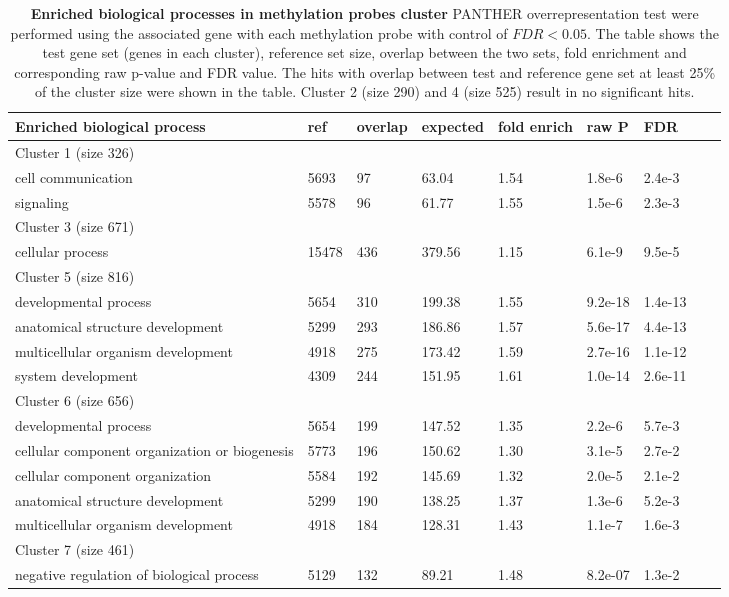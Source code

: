 \documentclass{article}
\begin{document}
\begin{table*}[ht!]
\centering
\begin{small}
\begin{tabular}{lllllllll}
  \toprule
Enriched biological process & ref & overlap & expected & fold enrich & raw P & FDR \\ 
  \midrule
  Cluster 1 (size 326) \\
  \midrule
  cell communication & 5693 &  97 & 63.04 & 1.54 & 1.8e-6 & 2.4e-3 \\ 
  signaling & 5578 &  96 & 61.77 & 1.55 & 1.5e-6 & 2.3e-3 \\ 
   \midrule
   Cluster 3 (size 671) \\
   \midrule
     cellular process & 15478 & 436 & 379.56 & 1.15 & 6.1e-9 & 9.5e-5 \\ 
\midrule
  Cluster 5 (size 816)\\
  \midrule
  developmental process  & 5654 & 310 & 199.38 & 1.55 & 9.2e-18 & 1.4e-13 \\ 
  anatomical structure development & 5299 & 293 & 186.86 & 1.57 & 5.6e-17 & 4.4e-13 \\ 
  multicellular organism development & 4918 & 275 & 173.42 & 1.59 & 2.7e-16 & 1.1e-12 \\ 
  system development & 4309 & 244 & 151.95 & 1.61 & 1.0e-14 & 2.6e-11 \\ 
     \midrule
   Cluster 6 (size 656)\\
  \midrule
  developmental process & 5654 & 199 & 147.52 & 1.35 & 2.2e-6 & 5.7e-3 \\ 
  cellular component organization or biogenesis & 5773 & 196 & 150.62 & 1.30 & 3.1e-5 & 2.7e-2 \\ 
  cellular component organization & 5584 & 192 & 145.69 & 1.32 & 2.0e-5 & 2.1e-2 \\ 
  anatomical structure development & 5299 & 190 & 138.25 & 1.37 & 1.3e-6 & 5.2e-3 \\ 
  multicellular organism development & 4918 & 184 & 128.31 & 1.43 & 1.1e-7 & 1.6e-3 \\ 
     \midrule
     Cluster 7 (size 461) \\
     \midrule
     negative regulation of biological process & 5129 & 132 & 89.21 & 1.48 & 8.2e-07 & 1.3e-2 \\ 
	\bottomrule
\end{tabular}
\end{small}
\caption{\textbf{Enriched biological processes in \citet{figueroa2010dna} methylation probes cluster} PANTHER overrepresentation test were performed using the associated gene with each methylation probe with control of $FDR < 0.05$. The table shows the test gene set (genes in each cluster), reference set size, overlap between the two sets, fold enrichment and corresponding raw p-value and FDR value. The hits with overlap between test and reference gene set at least 25\% of the cluster size were shown in the table. Cluster 2 (size 290) and 4 (size 525) result in no significant hits.}
\label{enriched}
\end{table*}
\end{document}
